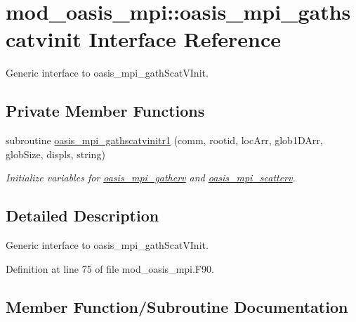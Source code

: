 \hypertarget{interfacemod__oasis__mpi_1_1oasis__mpi__gathscatvinit}{}\section{mod\+\_\+oasis\+\_\+mpi\+:\+:oasis\+\_\+mpi\+\_\+gathscatvinit Interface Reference}
\label{interfacemod__oasis__mpi_1_1oasis__mpi__gathscatvinit}


Generic interface to oasis\+\_\+mpi\+\_\+gath\+Scat\+V\+Init.  


\subsection*{Private Member Functions}
\begin{DoxyCompactItemize}
\item 
subroutine \hyperlink{interfacemod__oasis__mpi_1_1oasis__mpi__gathscatvinit_a15fc3df477e1fa561fcee17ed718bff8}{oasis\+\_\+mpi\+\_\+gathscatvinitr1} (comm, rootid, loc\+Arr, glob1\+D\+Arr, glob\+Size, displs, string)
\begin{DoxyCompactList}\small\item\em Initialize variables for \hyperlink{interfacemod__oasis__mpi_1_1oasis__mpi__gatherv}{oasis\+\_\+mpi\+\_\+gatherv} and \hyperlink{interfacemod__oasis__mpi_1_1oasis__mpi__scatterv}{oasis\+\_\+mpi\+\_\+scatterv}. \end{DoxyCompactList}\end{DoxyCompactItemize}


\subsection{Detailed Description}
Generic interface to oasis\+\_\+mpi\+\_\+gath\+Scat\+V\+Init. 

Definition at line 75 of file mod\+\_\+oasis\+\_\+mpi.\+F90.



\subsection{Member Function/\+Subroutine Documentation}
\mbox{\label{interfacemod__oasis__mpi_1_1oasis__mpi__gathscatvinit_a15fc3df477e1fa561fcee17ed718bff8}} 
